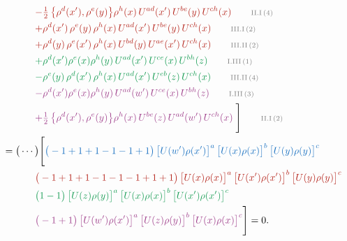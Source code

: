 \documentclass[10pt]{article}
\begin{document}
\begin{align}
&\qquad{\color{BrickRed}-\tfrac{1}{2}\,\big\{\rho^{d}(x'),\rho^{e}(y)\big\}\rho^{h}(x)\,U^{ad}(x')\,U^{be}(y)\,U^{ch}(x)}\tag*{\color{gray}\scriptsize II.I\,(4)}\\
&\qquad{\color{BrickRed}+\rho^{d}(x')\,\rho^{e}(y)\,\rho^{h}(x)\,U^{ad}(x')\,U^{be}(y)\,U^{ch}(x)}\tag*{\color{gray}\scriptsize III.I\,(2)}\\
&\qquad{\color{BrickRed}+\rho^{d}(y)\,\rho^{e}(x')\,\rho^{h}(x)\,U^{bd}(y)\,U^{ae}(x')\,U^{ch}(x)}\tag*{\color{gray}\scriptsize III.II\,(2)}\\
&\qquad{\color{ForestGreen}+\rho^{d}(x')\rho^{e}(x)\rho^{h}(y)\, U^{ad}(x')\,U^{ce}(x)\, U^{bh}(z)}\tag*{\color{gray}\scriptsize I.III\,(1)}\\
&\qquad{\color{ForestGreen}-\rho^{e}(y)\,\rho^{d}(x')\,\rho^{h}(x)\,U^{ad}(x')\,U^{eb}(z)\,U^{ch}(x)}\tag*{\color{gray}\scriptsize III.II\,(4)}\\
&\qquad{\color{DarkOrchid}-\rho^{d}(x')\rho^{e}(x)\rho^{h}(y)\, U^{ad}(w')\,U^{ce}(x)\, U^{bh}(z)}\tag*{\color{gray}\scriptsize I.III\,(3)}\\
&\qquad{\color{DarkOrchid}+\tfrac{1}{2}\,\big\{\rho^{d}(x'),\rho^{e}(y)\big\}\rho^{h}(x)\,U^{be}(z)\,U^{ad}(w')\,U^{ch}(x)}\;\Bigg]\tag*{\color{gray}\scriptsize II.I\,(2)}\\
={}&\big(\cdots\big)\Bigg[{\color{RoyalBlue}\big(-1+1+1-1-1+1\big)\,\big[U(w')\rho(x')\big]^{a}\,\big[U(x)\rho(x)\big]^{b}\,\big[U(y)\rho(y)\big]^{c}}\notag\\
&\qquad{\color{BrickRed}\big(-1+1+1-1-1-1+1+1\big)\,\big[U(x)\rho(x)\big]^{a}\,\big[U(x')\rho(x')\big]^{b}\,\big[U(y)\rho(y)\big]^{c}}\notag\\
&\qquad{\color{ForestGreen}\big(1-1\big)\,\big[U(z)\rho(y)\big]^{a}\,\big[U(x)\rho(x)\big]^{b}\,\big[U(x')\rho(x')\big]^{c}}\notag\\
&\qquad{\color{DarkOrchid}\big(-1+1\big)\,\big[U(w')\rho(x')\big]^{a}\,\big[U(z)\rho(y)\big]^{b}\,\big[U(x)\rho(x)\big]^{c}}\Bigg]=0.
\end{align}
\end{document}

